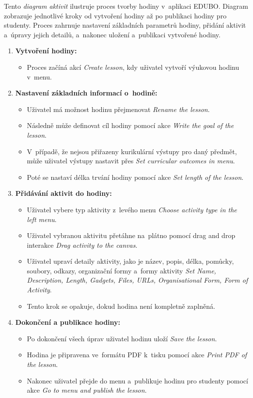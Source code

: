 \documentclass[male,czech,api_bc]{kitheses}
\begin{document}
Tento \textit{diagram aktivit} ilustruje proces tvorby hodiny v~aplikaci EDUBO. Diagram zobrazuje jednotlivé kroky od vytvoření hodiny až po publikaci hodiny pro studenty. Proces zahrnuje nastavení základních parametrů hodiny, přidání aktivit a~úpravy jejich detailů, a~nakonec uložení a~publikaci vytvořené hodiny.

\begin{enumerate}
	\item \textbf{Vytvoření hodiny:}
	\begin{itemize}
		\item Proces začíná akcí \textit{Create lesson}, kdy uživatel vytvoří výukovou hodinu v~menu.
	\end{itemize}
	
	\item \textbf{Nastavení základních informací o~hodině:}
	\begin{itemize}
		\item Uživatel má možnost hodinu přejmenovat \textit{Rename the lesson}.
		\item Následně může definovat cíl hodiny pomocí akce \textit{Write the goal of the lesson}.
		\item V~případě, že nejsou přiřazeny kurikulární výstupy pro daný předmět, může uživatel výstupy nastavit přes \textit{Set curricular outcomes in menu}.
		\item Poté se nastaví délka trvání hodiny pomocí akce \textit{Set length of the lesson}.
	\end{itemize}
	
	\item \textbf{Přidávání aktivit do hodiny:}
	\begin{itemize}
		\item Uživatel vybere typ aktivity z~levého menu \textit{Choose activity type in the left menu}.
		\item Uživatel vybranou aktivitu přetáhne na~plátno pomocí drag and drop interakce \textit{Drag activity to the canvas}.
		\item Uživatel upraví detaily aktivity, jako je název, popis, délka, pomůcky, soubory, odkazy, organizační formy a~formy aktivity \textit{Set Name, Description, Length, Gadgets, Files, URLs, Organisational Form, Form of Activity}.
		\item Tento krok se opakuje, dokud hodina není kompletně zaplněná.
	\end{itemize}
	
	\item \textbf{Dokončení a publikace hodiny:}
	\begin{itemize}
		\item Po dokončení všech úprav uživatel hodinu uloží \textit{Save the lesson}.
		\item Hodina je připravena ve~formátu PDF k~tisku pomocí akce \textit{Print PDF of the lesson}.
		\item Nakonec uživatel přejde do menu a~publikuje hodinu pro studenty pomocí akce \textit{Go to menu and publish the lesson}.
	\end{itemize}
\end{enumerate}
\end{document}
